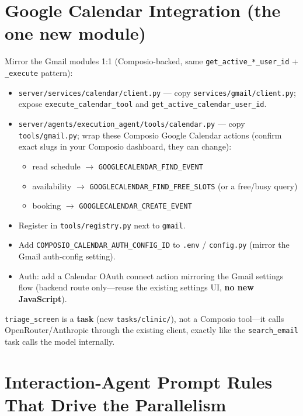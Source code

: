\documentclass[11pt,a4paper]{article}
\begin{document}
\section{Google Calendar Integration (the one new module)}

Mirror the Gmail modules 1:1 (Composio-backed, same \texttt{get\_active\_*\_user\_id} + \texttt{\_execute}
pattern):

\begin{itemize}[leftmargin=*]
  \item \texttt{server/services/calendar/client.py} --- copy \texttt{services/gmail/client.py}; expose
  \texttt{execute\_calendar\_tool} and \texttt{get\_active\_calendar\_user\_id}.
  \item \texttt{server/agents/execution\_agent/tools/calendar.py} --- copy \texttt{tools/gmail.py}; wrap these
  Composio Google Calendar actions (confirm exact slugs in your Composio dashboard, they can change):
  \begin{itemize}
    \item read schedule $\rightarrow$ \texttt{GOOGLECALENDAR\_FIND\_EVENT}
    \item availability $\rightarrow$ \texttt{GOOGLECALENDAR\_FIND\_FREE\_SLOTS} (or a free/busy query)
    \item booking $\rightarrow$ \texttt{GOOGLECALENDAR\_CREATE\_EVENT}
  \end{itemize}
  \item Register in \texttt{tools/registry.py} next to \texttt{gmail}.
  \item Add \texttt{COMPOSIO\_CALENDAR\_AUTH\_CONFIG\_ID} to \texttt{.env} / \texttt{config.py} (mirror the Gmail
  auth-config setting).
  \item Auth: add a Calendar OAuth connect action mirroring the Gmail settings flow (backend route only---reuse
  the existing settings UI, \textbf{no new JavaScript}).
\end{itemize}

\noindent \texttt{triage\_screen} is a \textbf{task} (new \texttt{tasks/clinic/}), not a Composio tool---it calls
OpenRouter/Anthropic through the existing client, exactly like the \texttt{search\_email} task calls the model
internally.

\section{Interaction-Agent Prompt Rules That Drive the Parallelism}
\end{document}
